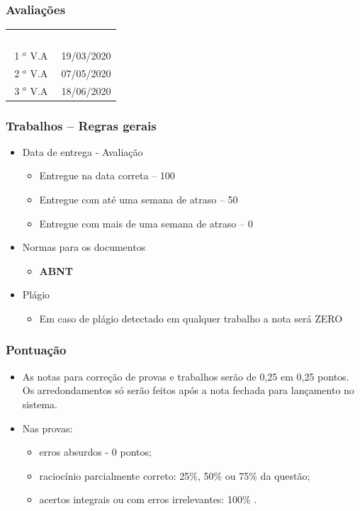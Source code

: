 \documentclass[aspectratio=169,
				xcolor=table]{beamer}
\begin{document}
	\begin{frame}
		\frametitle{Avaliações}
		\begin{eftable}
			\LARGE
			\begin{tabular}{c | c}
				\textcolor{white}{Avaliação} & 
				\textcolor{white}{Data} \\
				1 ${}^a$ V.A & 19/03/2020 \\
				2 ${}^a$ V.A & 07/05/2020 \\
				3 ${}^a$ V.A & 18/06/2020 \\			
			\end{tabular}
		\end{eftable}
	\end{frame}	
	
	\begin{frame}
		\frametitle{Trabalhos – Regras gerais}
		\begin{itemize}
			\item Data de entrega - Avaliação
			\begin{itemize}
				\item Entregue na data correta – 100%
				\item Entregue com até uma semana de atraso – 50%
				\item Entregue com mais de uma semana de atraso – 0%
			\end{itemize}
			\item Normas para os documentos
			\begin{itemize}
				\item \textbf{ABNT}
			\end{itemize}
			\item Plágio
			\begin{itemize}
				\item Em caso de plágio detectado em qualquer trabalho a nota será ZERO
			\end{itemize}
		\end{itemize}
	\end{frame}
	
	\begin{frame}
		\frametitle{Pontuação}
		\begin{itemize}
			\item As notas para correção de provas e trabalhos serão de 0,25 em 0,25 pontos. Os arredondamentos só serão feitos após a nota fechada para lançamento no sistema. 

			\item Nas provas: 
			\begin{itemize}
				\item erros absurdos - 0 pontos; 
				\item raciocínio parcialmente correto: 25\%, 50\% ou 75\% da questão; 
				\item acertos integrais ou com erros irrelevantes: 100\% .

			\end{itemize}

		\end{itemize}
	\end{frame}
	
\end{document}
